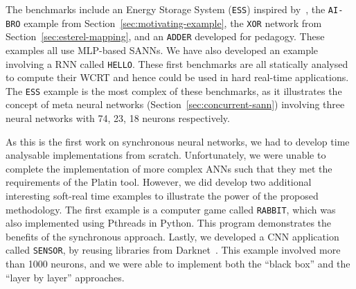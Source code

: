 The benchmarks include an Energy
Storage System (\texttt{ESS}) inspired by~\cite{chaudhari2017hybrid},
the \texttt{AI-BRO} example from Section~\ref{sec:motivating-example}, the \texttt{XOR} network from Section~\ref{sec:esterel-mapping}, and an \texttt{ADDER} developed for
pedagogy. These examples all use \ac{MLP}-based
\acp{SANN}. We have also developed an example involving a \ac{RNN}
called \texttt{HELLO}. 
These first benchmarks are all statically analysed to
compute their \ac{WCRT} and hence could be used in hard real-time
applications. The \texttt{ESS} example is the most complex of these
benchmarks, as it illustrates the concept of meta neural networks
(Section~\ref{sec:concurrent-sann}) involving three neural networks
with 74, 23, 18 neurons respectively.

As this is the first work on synchronous neural networks, we had to
develop time analysable implementations from scratch. Unfortunately, we were unable
to complete the implementation of more complex \acp{ANN} such that they met the requirements of the Platin tool. 
However, we did develop two additional interesting soft-real time examples to illustrate the power of the proposed methodology. The
first example is a computer game called \texttt{RABBIT}, which was
also implemented using Pthreads in Python.
This program demonstrates the
benefits of the synchronous approach. 
Lastly, we developed a \ac{CNN} application called \texttt{SENSOR}, by reusing
libraries from Darknet~\cite{redmon2015real}. This example involved more than 1000 neurons, and we
were able to implement both the ``black box'' and the ``layer by layer'' approaches.





